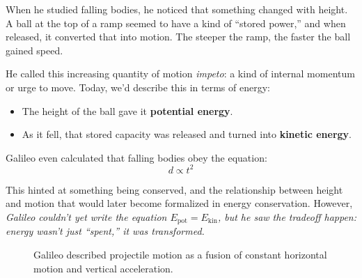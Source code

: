 When he studied falling bodies, he noticed that something changed with height. A ball at the top of a ramp seemed to have a kind of “stored power,” and when released, it converted that into motion. The steeper the ramp, the faster the ball gained speed.

He called this increasing quantity of motion \textit{impeto}: a kind of internal momentum or urge to move. Today, we’d describe this in terms of energy:

\begin{itemize}
    \item The height of the ball gave it \textbf{potential energy}.
    \item As it fell, that stored capacity was released and turned into \textbf{kinetic energy}.
\end{itemize}

Galileo even calculated that falling bodies obey the equation:
\[
d \propto t^2
\]

This hinted at something being conserved, and the relationship between height and motion that would later become formalized in energy conservation.  However, \textit{Galileo couldn’t yet write the equation \( E_{\text{pot}} = E_{\text{kin}} \), but he saw the tradeoff happen: energy wasn’t just “spent,” it was transformed.}

\begin{figure}[H]
\centering
{}
\caption{\small Galileo described projectile motion as a fusion of constant horizontal motion and vertical acceleration.}
\end{figure}

